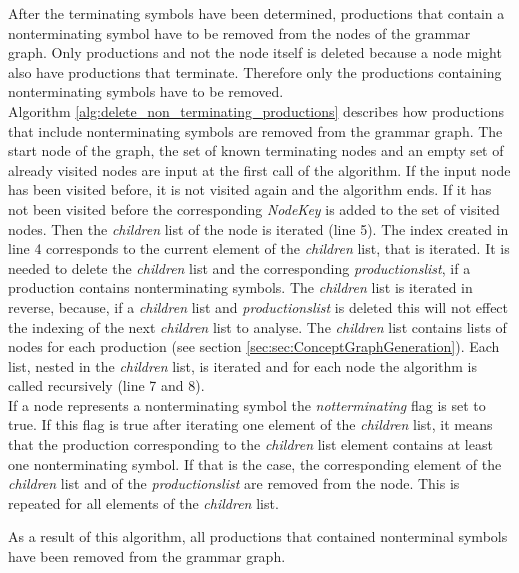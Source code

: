 After the terminating symbols have been determined, productions that contain a nonterminating symbol have to be removed from the nodes of the grammar graph. Only productions and not the node itself is deleted because a node might also have productions that terminate. Therefore only the productions containing nonterminating symbols have to be removed.\\
Algorithm \ref{alg:delete_non_terminating_productions}  describes how productions that include nonterminating symbols are removed from the grammar graph.
The start node of the graph, the set of known terminating nodes and an empty set of already visited nodes are input at the first call of the algorithm.
If the input node has been visited before, it is not visited again and the algorithm ends.
If it has not been visited before the corresponding \textit{Node\textunderscore Key} is added to the set of visited nodes.
Then the \textit{children} list of the node is iterated (line 5).
The index created in line 4 corresponds to the current element of the \textit{children} list, that is iterated.
It is needed to delete the \textit{children} list and the corresponding \textit{productions\textunderscore list}, if a production contains nonterminating symbols. The \textit{children} list is iterated in reverse, because, if a \textit{children} list and \textit{productions\textunderscore list} is deleted this will not effect the indexing of the next \textit{children} list to analyse.
The \textit{children} list contains lists of nodes for each production (see section \ref{sec:sec:ConceptGraphGeneration}). Each list, nested in the \textit{children} list, is iterated and for each node the algorithm is called recursively (line 7 and 8).\\
If a node represents a nonterminating symbol the \textit{not\textunderscore terminating} flag is set to true.
If this flag is true after iterating one element of the \textit{children} list, it means that the production corresponding to the \textit{children} list element contains at least one nonterminating symbol.
If that is the case, the corresponding element of the \textit{children} list and of the \textit{productions\textunderscore list} are removed from the node.
This is repeated for all elements of the \textit{children} list.

As a result of this algorithm, all productions that contained nonterminal symbols have been removed from the grammar graph.

